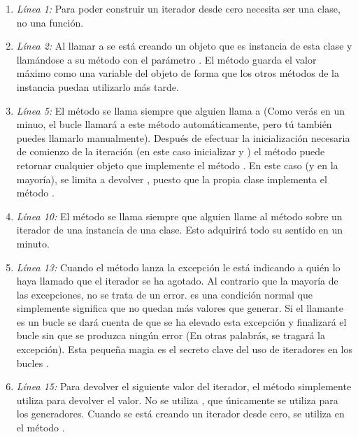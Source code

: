 \begin{enumerate}

\item \emph{Línea 1:} Para poder construir un iterador desde cero  necesita ser una clase, no una función.

\item \emph{Línea 2:} Al llamar a  se está creando un objeto que es instancia de esta clase y llamándose a su método  con el parámetro . El método  guarda el valor máximo como una variable del objeto de forma que los otros métodos de la instancia puedan utilizarlo más tarde.

\item \emph{Línea 5:} El método  se llama siempre que alguien llama a  (Como verás en un minuo, el bucle  llamará a este método automáticamente, pero tú también puedes llamarlo manualmente). Después de efectuar la inicialización necesaria de comienzo de la iteración (en este caso inicializar  y ) el método  puede retornar cualquier objeto que implemente el método . En este caso (y en la mayoría),  se limita a devolver , puesto que la propia clase implementa el método .

\item \emph{Línea 10:} El método  se llama siempre que alguien llame al método  sobre un iterador de una instancia de una clase. Esto adquirirá todo su sentido en un minuto.

\item \emph{Línea 13:} Cuando el método  lanza la excepción  le está indicando a quién lo haya llamado que el iterador se ha agotado. Al contrario que la mayoría de las excepciones, no se trata de un error. es una condición normal que simplemente significa que no quedan más valores que generar. Si el llamante es un bucle  se dará cuenta de que se ha elevado esta excepción y finalizará el bucle sin que se produzca ningún error (En otras palabrás, se tragará la excepción). Esta pequeña magia es el secreto clave del uso de iteradores en los bucles .

\item \emph{Línea 15:} Para devolver el siguiente valor del iterador, el método  simplemente utiliza  para devolver el valor. No se utiliza , que únicamente se utiliza para los generadores. Cuando se está creando un iterador desde cero, se utiliza  en el método .

\end{enumerate}

